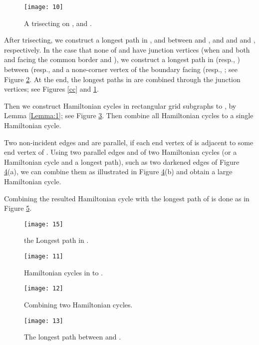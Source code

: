 \documentclass[preprint,12pt]{elsarticle}
\begin{document}
\begin{figure}[htb]
  \centering
  \texttt{[image: 10]}
  \caption[]{\small A trisecting on ,  and .}
  \label{ccv}
\end{figure}
After trisecting, we construct a longest path in ,
 and  between  and ,  and  and 
and , respectively. In the case that none of  and
 have junction vertices (when  and both  and
 facing the common border  and ), we
construct a longest path in  (resp., ) between
 (resp.,  and a none-corner vertex of the boundary facing
 (resp., ; see Figure \ref{cd1}. At the end,
the longest paths in  are combined through the junction
vertices; see Figures \ref{cc} and \ref{ccv}.\par Then we construct
Hamiltonian cycles in rectangular grid subgraphs  to , by
Lemma \ref{Lemma:1}; see Figure \ref{cd}. Then combine all
Hamiltonian cycles to a single Hamiltonian cycle. \par Two
non-incident edges  and  are parallel, if each end vertex
of  is adjacent to some end vertex of . Using two parallel
edges  and  of two Hamiltonian cycles (or a Hamiltonian
cycle and a longest path), such as two darkened edges of Figure
\ref{cm}(a), we can combine them as illustrated in Figure
\ref{cm}(b) and obtain a large Hamiltonian cycle.\par Combining the
resulted Hamiltonian cycle with
the longest path of  is done as in Figure \ref{cn}. \\

\begin{figure}[htb]
  \centering
  \texttt{[image: 15]}
  \caption[]{\small the Longest path in .}
  \label{cd1}
\end{figure}

\begin{figure}[htb]
  \centering
  \texttt{[image: 11]}
  \caption[]{\small Hamiltonian cycles in  to .}
  \label{cd}
\end{figure}

\begin{figure}[htb]
  \centering
  \texttt{[image: 12]}
  \caption[]{\small Combining two Hamiltonian cycles.}
  \label{cm}
\end{figure}

\begin{figure}[htb]
  \centering
  \texttt{[image: 13]}
  \caption[]{\small The longest path between  and .}
  \label{cn}
\end{figure}
\end{document}
